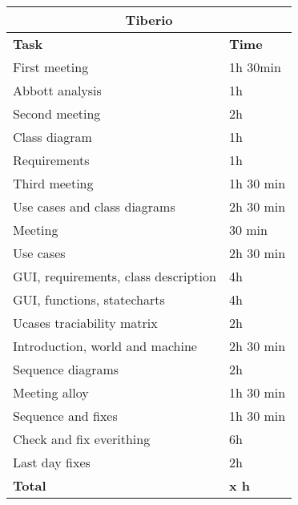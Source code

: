 \begin{table}[H]
\begin{tabular}{|l|l|}
\hline
\multicolumn{2}{|c|}{\textbf{Tiberio}}            \\ \hline
\textbf{Task}                   & \textbf{Time} \\ \hline
First meeting                        & 1h 30min     \\ \hline
Abbott analysis                      & 1h        \\ \hline
Second meeting                       & 2h        \\ \hline
Class diagram                        & 1h        \\ \hline
Requirements                         & 1h        \\ \hline
Third meeting                        & 1h 30 min \\ \hline
Use cases and class diagrams         & 2h 30 min \\ \hline
Meeting                              & 30 min    \\ \hline
Use cases                            & 2h 30 min \\ \hline
GUI, requirements, class description & 4h        \\ \hline
GUI, functions, statecharts          & 4h        \\ \hline
Ucases traciability matrix           & 2h        \\ \hline
Introduction, world and machine      & 2h 30 min \\ \hline
Sequence diagrams                    & 2h        \\ \hline
Meeting alloy                        & 1h 30 min \\ \hline
Sequence and fixes                   & 1h 30 min \\ \hline
Check and fix everithing             & 6h        \\ \hline
Last day fixes                       & 2h        \\ \hline
\rowcolor {polilight}
\textbf{Total}                  & \textbf{x h}   \\ \hline
\end{tabular}
\end{table}


